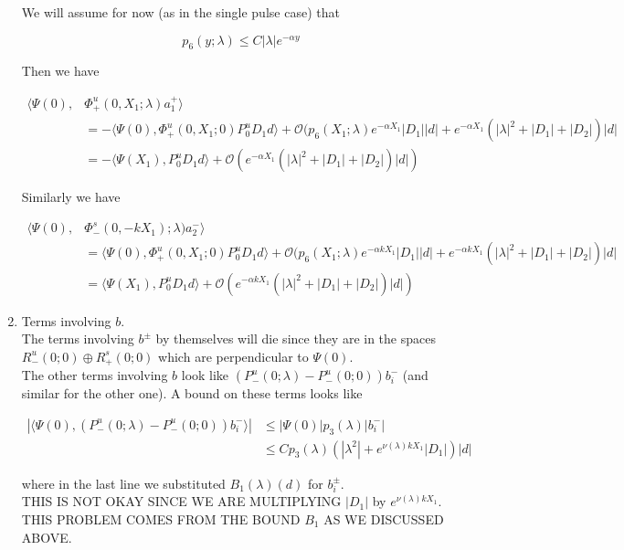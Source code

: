 \documentclass[12pt]{article}
\begin{document}
\begin{enumerate}
We will assume for now (as in the single pulse case) that

\[
p_6(y; \lambda) \leq C |\lambda| e^{-\alpha y}
\]

Then we have

\begin{align*}
\langle \Psi(0), &\Phi^u_+(0, X_1; \lambda) a_1^+ \rangle \\
&= -\langle \Psi(0), \Phi^u_+(0, X_1; 0) P^u_0 D_1 d \rangle + \mathcal{O}( p_6(X_1; \lambda) e^{-\alpha X_1}|D_1||d| + e^{-\alpha X_1} (|\lambda|^2 + |D_1| + |D_2| )|d| \\
&= -\langle \Psi(X_1), P^u_0 D_1 d \rangle + \mathcal{O}( e^{-\alpha X_1}( |\lambda|^2 + |D_1| + |D_2|)|d|)
\end{align*}

Similarly we have

\begin{align*}
\langle \Psi(0), &\Phi^s_-(0, -k X_1); \lambda)a_2^- \rangle \\
&= \langle \Psi(0), \Phi^u_+(0, X_1; 0) P^u_0 D_1 d \rangle + \mathcal{O}( p_6(X_1; \lambda) e^{-\alpha k X_1}|D_1||d| + e^{-\alpha k X_1} (|\lambda|^2 + |D_1| + |D_2| )|d| \\
&= \langle \Psi(X_1), P^u_0 D_1 d \rangle + \mathcal{O}( e^{-\alpha k X_1}( |\lambda|^2 + |D_1| + |D_2|)|d|)
\end{align*}


\item Terms involving $b$.\\

The terms involving $b^\pm$ by themselves will die since they are in the spaces $R^u_-(0; 0) \oplus R^s_+(0; 0)$ which are perpendicular to $\Psi(0)$.\\

The other terms involving $b$ look like $(P^u_-(0; \lambda) - P^u_-(0; 0))b_i^-$ (and similar for the other one). A bound on these terms looks like

\begin{align*}
|\langle \Psi(0), (P^u_-(0; \lambda) - P^u_-(0; 0))b_i^- \rangle|
&\leq |\Psi(0)| p_3(\lambda)|b_i^-| \\
&\leq C p_3(\lambda) (|\lambda^2| + e^{\nu(\lambda)k X_1}|D_1|)|d|
\end{align*}

where in the last line we substituted $B_1(\lambda)(d)$ for $b_i^\pm$.\\

THIS IS NOT OKAY SINCE WE ARE MULTIPLYING $|D_1|$ by $e^{\nu(\lambda)k X_1}$. THIS PROBLEM COMES FROM THE BOUND $B_1$ AS WE DISCUSSED ABOVE.


\end{enumerate}
\end{document}
